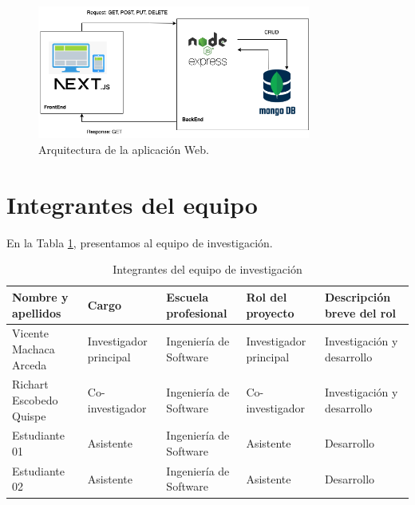 \documentclass[a4paper]{article}
\begin{document}
\begin{figure}[H]
	\centering
	\includegraphics[width=0.8\textwidth]{latex/img/neoantigen/arquitectura.png}
	\caption{Arquitectura de la aplicación Web.}
	\label{fig:arquitectura}
\end{figure}


	
	
	

\clearpage

\section{Integrantes del equipo}
En la Tabla \ref{tab:integrantes}, presentamos al equipo de investigación.

\begin{table}[H]
\caption{Integrantes del equipo de investigación}
\label{tab:integrantes}
\begin{tabular}{p{3cm}p{2cm}p{2cm}p{2cm}p{3cm}}
\textbf{Nombre y apellidos} & \textbf{Cargo}         & \textbf{Escuela profesional} & \textbf{Rol del proyecto} & \textbf{Descripción breve del rol} \\ \hline
Vicente Machaca Arceda      & Investigador principal & Ingeniería de Software       & Investigador principal    & Investigación y desarrollo         \\
Richart Escobedo Quispe     & Co-investigador        & Ingeniería de Software       & Co-investigador           & Investigación y desarrollo         \\
Estudiante 01               & Asistente              & Ingeniería de Software       & Asistente                 & Desarrollo                         \\
Estudiante 02               & Asistente              & Ingeniería de Software       & Asistente                 & Desarrollo          \\ \hline              
\end{tabular}
\end{table}
\end{document}
